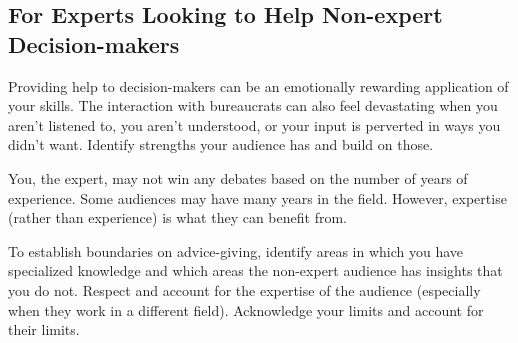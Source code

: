 



\subsection*{For Experts Looking to Help Non-expert Decision-makers}

Providing help to decision-makers can be an emotionally rewarding application of your skills. The interaction with bureaucrats can also feel devastating when you aren't listened to, you aren't understood, or your input is perverted in ways you didn't want. %
Identify strengths your audience has and build on those.








You, the expert, may not win any debates based on the number of years of experience. Some audiences may have many years in the field. However, expertise (rather than experience) is what they can benefit from. 

To establish boundaries on advice-giving, identify areas in which you have specialized knowledge and which areas  the non-expert audience has insights that you do not.
Respect and account for the expertise of the audience (especially when they work in a different field). Acknowledge your  limits and account for their limits.

